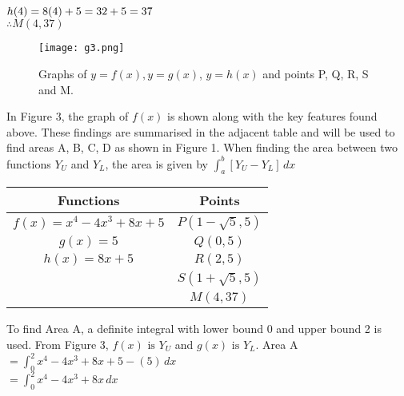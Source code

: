 \documentclass{homework}
\begin{document}
\begin{flushleft}
\begin{paracol}{2}
    $h(4)=8(4)+5=32+5=37 \vspace{0.8em}$ \vspace{0.7em}\\
    $\therefore M(4, 37) $ \vspace{1.7em}\\
    \switchcolumn
        \begin{figure}[htp]
        \centering
        \texttt{[image: g3.png]}
        \caption{Graphs of $y=f(x), y=g(x)$, $y=h(x)$ and points P, Q, R, S and M.}
        \label{fig:g3}
    \end{figure}
  \end{paracol}
\end{flushleft}
\begin{center}
\begin{paracol}{2}
    In Figure 3, the graph of $f(x)$ is shown along with the key features found above.  
    These findings are summarised in the adjacent table and will be used to find areas A, B, C, D as shown in Figure 1. \linebreak \linebreak
    When finding the area between two functions $Y_U$ and $Y_L$, the area is given by $\int_a^{b}[Y_U-Y_L]\, dx$
\switchcolumn
\begingroup
\renewcommand{\arraystretch}{1.3}
    \begin{tabular}{ |c|c| } 
        \hline
        Functions & Points \\
        \hline
        $ f(x)=x^4-4x^3+8x+5 $ & $P(1-\sqrt{5}, 5)$ \\ 
        \hline
        $ g(x)=5 $ & $Q(0, 5)$ \\ 
        \hline
        $ h(x)=8x+5 $ & $ R(2, 5) $ \\ 
        \hline
        {} & $ S(1+\sqrt{5}, 5) $ \\ 
        \hline
        {} & $ M(4, 37) $ \\ 
        \hline
    \end{tabular}
    \endgroup
    \end{paracol}
\end{center} \vspace{1.4em}
\begin{flushleft}
  To find Area A, a definite integral with lower bound 0 and upper bound 2 is used. 
   From Figure 3, $f(x) \text{ is } Y_U$ and $g(x) \text{ is } Y_L$. \linebreak \linebreak
   Area A $=\int_0^{2} x^4-4x^3+8x+5-(5) \, dx$ \vspace{0.4em} \\
   $=\int_0^{2} x^4-4x^3+8x \, dx $ \vspace{0.4em} 
\end{flushleft}
\end{document}
